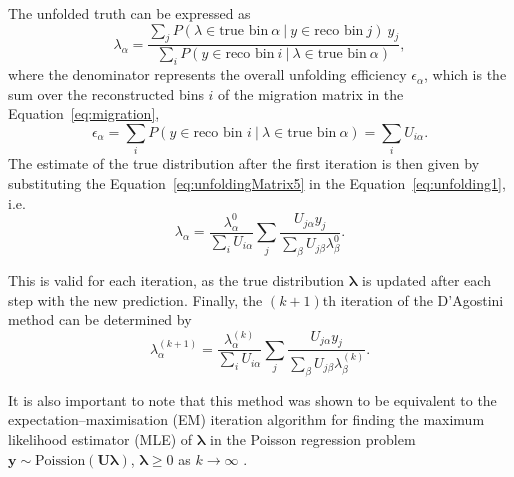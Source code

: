 The unfolded truth can be expressed as 
\begin{equation}
    \label{eq:unfolding1}
    \lambda_{\alpha} = \frac{\sum_{j} P(\lambda \in \text{true bin} ~\alpha~|~y \in \text{reco bin}~j)~y_{j}}{\sum_{i} P(y \in \text{reco bin}~i~|~\lambda \in \text{true bin}~\alpha)},
\end{equation}
where the denominator represents the overall unfolding efficiency $\epsilon_{\alpha}$, which is the sum over the reconstructed bins $i$ of the migration matrix in the Equation~\ref{eq:migration}, 
\begin{equation}
    \label{eq:efficiencyUnfolding}
    \epsilon_{\alpha} = \sum_{i} P(y \in \text{reco bin } i~|~\lambda \in \text{true bin}~\alpha) = \sum_{i} U_{i\alpha}.
\end{equation}
The estimate of the true distribution after the first iteration is then given by substituting the Equation~\ref{eq:unfoldingMatrix5} in the Equation~\ref{eq:unfolding1}, i.e. 
\begin{equation}
    \label{eq:unfolding2}
    \lambda_{\alpha} = \frac{\lambda_{\alpha}^0}{\sum_{i}U_{i\alpha}}\sum_{j} \frac{U_{j\alpha}y_j}{\sum_{\beta}U_{j\beta}\lambda_{\beta}^0}.
\end{equation}

This is valid for each iteration, as the true distribution $\boldsymbol{\lambda}$ is updated after each step with the new prediction. Finally, the $(k+1)$th iteration of the D'Agostini method can be determined by 
\begin{equation}
    \label{eq:unfolding3}
    \lambda_{\alpha}^{(k+1)} = \frac{\lambda_{\alpha}^{(k)}}{\sum_{i}U_{i\alpha}}\sum_{j} \frac{U_{j\alpha}y_j}{\sum_{\beta}U_{j\beta}\lambda_{\beta}^{(k)}}.
\end{equation}

It is also important to note that this method was shown to be equivalent to the expectation--maximisation (EM) iteration algorithm \cite{EM:477e7e2b-4ded-3369-981e-9b40850a2701} for finding the maximum likelihood estimator (MLE) of $\boldsymbol{\lambda}$ in the Poisson regression problem $\boldsymbol{y} \sim \text{Poission}(\boldsymbol{U\lambda})$, $\boldsymbol{\lambda} \geq 0$ as $k \rightarrow \infty$ \cite{McLachlan2004Algorithm, KuuselaThesis2016}.